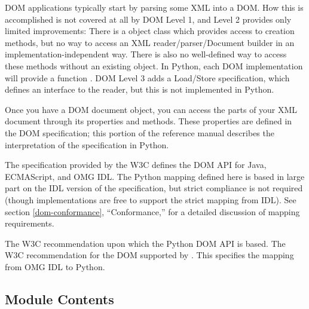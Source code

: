 DOM applications typically start by parsing some XML into a DOM.  How
this is accomplished is not covered at all by DOM Level 1, and Level 2
provides only limited improvements: There is a
 object class which provides access to
 creation methods, but no way to access an XML
reader/parser/Document builder in an implementation-independent way.
There is also no well-defined way to access these methods without an
existing  object.  In Python, each DOM implementation
will provide a function . DOM Level 3
adds a Load/Store specification, which defines an interface to the
reader, but this is not implemented in Python.

Once you have a DOM document object, you can access the parts of your
XML document through its properties and methods.  These properties are
defined in the DOM specification; this portion of the reference manual
describes the interpretation of the specification in Python.

The specification provided by the W3C defines the DOM API for Java,
ECMAScript, and OMG IDL.  The Python mapping defined here is based in
large part on the IDL version of the specification, but strict
compliance is not required (though implementations are free to support
the strict mapping from IDL).  See section \ref{dom-conformance},
``Conformance,'' for a detailed discussion of mapping requirements.


\begin{seealso}
           {The W3C recommendation upon which the Python DOM API is
            based.}
           {The W3C recommendation for the
            DOM supported by .}
           {This specifies the mapping from OMG IDL to Python.}
\end{seealso}

\subsection{Module Contents}

